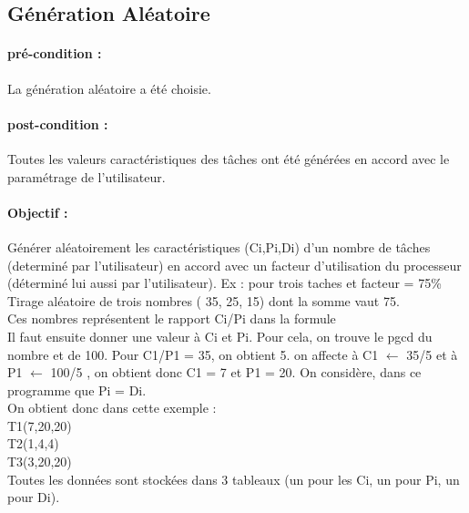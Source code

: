 	\newpage
	\subsection{Génération Aléatoire}
		\paragraph{pré-condition :} La génération aléatoire a été choisie.
		\paragraph{post-condition :} Toutes les valeurs caractéristiques des tâches ont été générées en accord avec le paramétrage de l’utilisateur.


		\paragraph{Objectif :} Générer aléatoirement les caractéristiques (Ci,Pi,Di) d’un nombre de tâches (determiné par l’utilisateur) en accord avec un facteur d’utilisation du processeur (déterminé lui aussi par l’utilisateur).
		Ex : pour trois taches et facteur = 75\% \\ 


		    Tirage aléatoire de trois nombres ( 35, 25, 15) dont la somme vaut 75. \\
		    Ces nombres représentent le rapport Ci/Pi dans la formule  \\
		    Il faut ensuite donner une valeur à Ci et Pi. Pour cela, on trouve le pgcd du nombre et de 100. Pour C1/P1 = 35, on obtient 5.  on affecte à C1 $\leftarrow$ 35/5 et à P1 $\leftarrow$ 100/5 , on obtient donc C1 = 7 et P1 = 20. On considère, dans ce programme que Pi = Di. \\
		    
		    On obtient donc dans cette exemple :  \\
		    T1(7,20,20) \\
		    T2(1,4,4) \\
		    T3(3,20,20) \\

		    Toutes les données sont stockées dans 3 tableaux (un pour les Ci, un pour Pi, un pour Di). 

